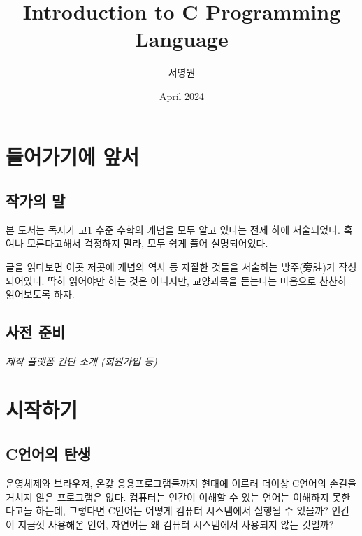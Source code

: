 \documentclass[a4paper,12pt]{book}
\title{Introduction to C Programming Language}
\author{서영원}
\date{April 2024}
\begin{document}
\linespread{1.5}

\maketitle

\tableofcontents

\vfill
\doclicenseThis


\pagebreak



\chapter{들어가기에 앞서}


\section{작가의 말}

본 도서는 독자가 고1 수준 수학의 개념을 모두 알고 있다는 전제 하에 서술되었다.
혹여나 모른다고해서 걱정하지 말라, 모두 쉽게 풀어 설명되어있다.

글을 읽다보면 이곳 저곳에 개념의 역사 등 자잘한 것들을 서술하는 방주(旁註)가 작성되어있다.
딱히 읽어야만 하는 것은 아니지만, 교양과목을 듣는다는 마음으로 찬찬히 읽어보도록 하자.


\section{사전 준비}

\textit{제작 플랫폼 간단 소개 (회원가입 등)}


\chapter{시작하기}


\section{C언어의 탄생}

운영체제와 브라우저, 온갖 응용프로그램들까지 현대에 이르러 더이상
C언어의 손길을 거치지 않은 프로그램은 없다.
컴퓨터는 인간이 이해할 수 있는 언어는 이해하지 못한다고들 하는데,
그렇다면 C언어는 어떻게 컴퓨터 시스템에서 실행될 수 있을까?
인간이 지금껏 사용해온 언어, 자연어는 왜 컴퓨터 시스템에서 사용되지 않는
것일까?
\end{document}
